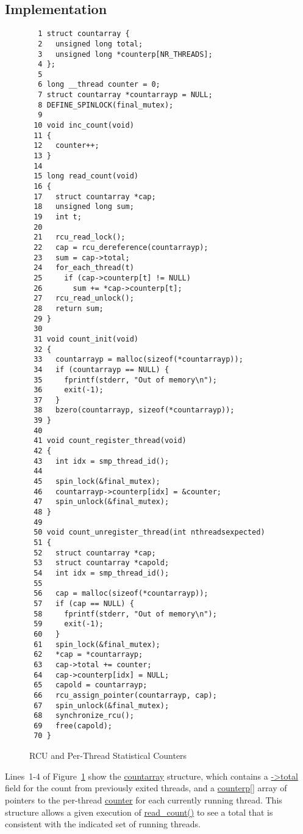 \subsection{Implementation}

\begin{figure}[bp]
{ \scriptsize
\begin{verbatim}
  1 struct countarray {
  2   unsigned long total;
  3   unsigned long *counterp[NR_THREADS];
  4 };
  5 
  6 long __thread counter = 0;
  7 struct countarray *countarrayp = NULL;
  8 DEFINE_SPINLOCK(final_mutex);
  9 
 10 void inc_count(void)
 11 {
 12   counter++;
 13 }
 14 
 15 long read_count(void)
 16 {
 17   struct countarray *cap;
 18   unsigned long sum;
 19   int t;
 20 
 21   rcu_read_lock();
 22   cap = rcu_dereference(countarrayp);
 23   sum = cap->total;
 24   for_each_thread(t)
 25     if (cap->counterp[t] != NULL)
 26       sum += *cap->counterp[t];
 27   rcu_read_unlock();
 28   return sum;
 29 }
 30 
 31 void count_init(void)
 32 {
 33   countarrayp = malloc(sizeof(*countarrayp));
 34   if (countarrayp == NULL) {
 35     fprintf(stderr, "Out of memory\n");
 36     exit(-1);
 37   }
 38   bzero(countarrayp, sizeof(*countarrayp));
 39 }
 40 
 41 void count_register_thread(void)
 42 {
 43   int idx = smp_thread_id();
 44 
 45   spin_lock(&final_mutex);
 46   countarrayp->counterp[idx] = &counter;
 47   spin_unlock(&final_mutex);
 48 }
 49 
 50 void count_unregister_thread(int nthreadsexpected)
 51 {
 52   struct countarray *cap;
 53   struct countarray *capold;
 54   int idx = smp_thread_id();
 55 
 56   cap = malloc(sizeof(*countarrayp));
 57   if (cap == NULL) {
 58     fprintf(stderr, "Out of memory\n");
 59     exit(-1);
 60   }
 61   spin_lock(&final_mutex);
 62   *cap = *countarrayp;
 63   cap->total += counter;
 64   cap->counterp[idx] = NULL;
 65   capold = countarrayp;
 66   rcu_assign_pointer(countarrayp, cap);
 67   spin_unlock(&final_mutex);
 68   synchronize_rcu();
 69   free(capold);
 70 }
\end{verbatim}
}
\caption{RCU and Per-Thread Statistical Counters}
\label{fig:count:RCU and Per-Thread Statistical Counters}
\end{figure}

Lines~1-4 of
Figure~\ref{fig:count:RCU and Per-Thread Statistical Counters}
show the \url{countarray} structure, which contains a
\url{->total} field for the count from previously exited threads,
and a \url{counterp[]} array of pointers to the per-thread
\url{counter} for each currently running thread.
This structure allows a given execution of \url{read_count()}
to see a total that is consistent with the indicated set of running
threads.

